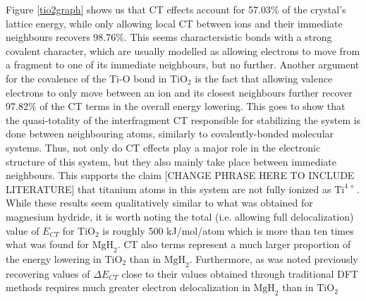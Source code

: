 \documentclass[aps,prb,twocolumn,amsmath,amssymb,superscriptaddress,longbibliography]{revtex4-1}
\newcommand{\N}{\mathbb{N}}
\newcommand{\C}{\mathbb{C}}
\begin{document}
Figure \ref{tio2graph} shows us that CT effects account for 57.03\% of the crystal's lattice energy, while only allowing local CT between ions and their immediate neighbours recovers 98.76\%.
This seems charactersistic bonds with a strong covalent character, which are usually modelled as allowing electrons to move from a fragment to one of its immediate neighbours, but no further. 
Another argument for the covalence of the Ti-O bond in $\text{TiO}_{2}$ is the fact that allowing valence electrons to only move between an ion and its closest neighbours further recover 97.82\% of the CT terms in the overall energy lowering. 
This goes to show that the quasi-totality of the interfragment CT responsible for stabilizing the system is done between neighbouring atoms, similarly to covalently-bonded molecular systems. 
Thus, not only do CT effects play a major role in the electronic structure of this system, but they also mainly take place between immediate neighbours. 
This supports the claim [CHANGE PHRASE HERE TO INCLUDE LITERATURE] that titanium atoms in this system are not fully ionized as $\text{Ti}^{4+}$.\\

While these results seem qualitatively similar to what was obtained for magnesium hydride, it is worth noting the total (i.e. allowing full delocalization) value of $E_{CT}$ for $\text{TiO}_{2}$ is roughly 500 kJ/mol/atom which is more than ten times what was found for $\text{MgH}_{2}$.
CT also terms represent a much larger proportion of the energy lowering in $\text{TiO}_{2}$ than in $\text{MgH}_{2}$.
Furthermore, as was noted previously recovering values of $\Delta E_{CT}$ close to their values obtained through traditional DFT methods requires much greater electron delocalization in $\text{MgH}_{2}$ than in $\text{TiO}_{2}$
  














\end{document}
